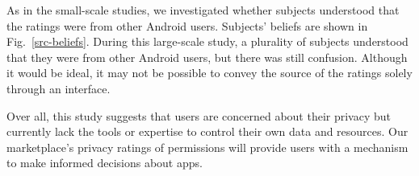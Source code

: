 \documentclass[11pt]{article}
\begin{document}
As in the small-scale studies, we investigated whether subjects understood 
that the ratings were from other Android users. Subjects' beliefs are shown 
in Fig.~\ref{src-beliefs}.
During 
this large-scale study, a plurality of subjects understood that they were from other 
Android users, but there was still confusion. 
Although it would be ideal, it may not be possible to convey the 
source of the ratings solely through an interface. 


Over all, this study suggests that users are 
concerned about their privacy but currently lack the tools 
or expertise to control their own data and resources. Our 
marketplace's privacy ratings of permissions will provide users
with a mechanism to make informed decisions about apps.
\end{document}
